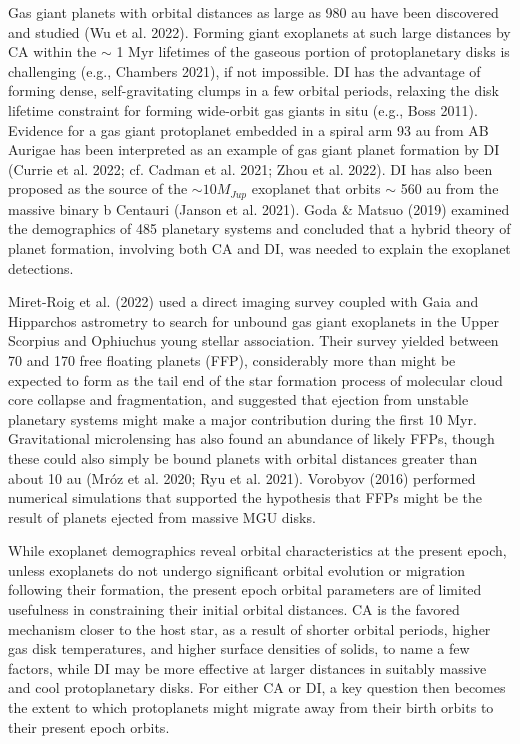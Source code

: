 \documentclass[12pt,preprint]{aastex}
\begin{document}
 Gas giant planets with orbital distances as large as 980 au have been discovered and studied (Wu et al. 2022).
Forming giant exoplanets at such large distances by CA within the $\sim$ 1 Myr lifetimes of the  gaseous 
portion of protoplanetary disks is challenging (e.g., Chambers 2021), if not impossible.
DI has the advantage of forming dense, self-gravitating clumps in a few orbital periods, relaxing the disk 
lifetime constraint for forming wide-orbit gas giants in situ (e.g., Boss 2011).
Evidence for a gas giant protoplanet embedded in a spiral arm 93 au from AB Aurigae has been
interpreted as an example of gas giant planet formation by DI (Currie et al. 2022; cf. Cadman et al. 2021;
Zhou et al. 2022). DI has also been proposed as the source of the  $\sim 10 M_{Jup}$ exoplanet that 
orbits $\sim$ 560 au from the massive binary b Centauri (Janson et al. 2021).
Goda \& Matsuo (2019) examined the demographics of 485 planetary systems and concluded
that a hybrid theory of planet formation, involving both CA and DI, was needed to explain the
exoplanet detections.

 Miret-Roig et al. (2022) used a direct imaging survey coupled with Gaia and Hipparchos astrometry to
search for unbound gas giant exoplanets in the Upper Scorpius and Ophiuchus young stellar association.
Their survey yielded between 70 and 170 free floating planets (FFP), considerably more than might be
expected to form as  the tail end of the star formation process of molecular cloud core collapse and
fragmentation, and suggested that ejection from unstable planetary systems might make a major contribution
during the first 10 Myr. Gravitational microlensing has also found an abundance of likely FFPs, though 
these could also simply be bound planets with orbital distances greater than about 10 au 
(Mr\'oz et al. 2020; Ryu et al. 2021). Vorobyov (2016) performed numerical simulations that
supported the hypothesis that FFPs might be the result of planets ejected from massive MGU disks.

 While exoplanet demographics reveal orbital characteristics at the present epoch, unless exoplanets
do not undergo significant orbital evolution or migration following their formation, the present epoch 
orbital parameters are of limited usefulness in constraining their initial orbital distances. CA is the favored 
mechanism closer to the host star, as a result of shorter orbital periods, higher gas disk temperatures,
and higher surface densities of solids, to name a few factors, while DI may be more effective at larger 
distances in suitably massive and cool protoplanetary disks. For either CA or DI, a key question then 
becomes the extent to which protoplanets might migrate away from their birth orbits to their present 
epoch orbits.
\end{document}
